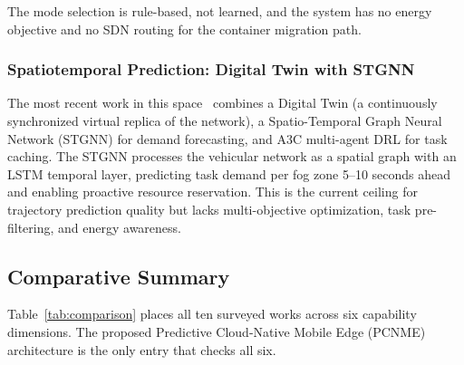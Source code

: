 \documentclass[12pt,a4paper]{article}
\begin{document}
The mode selection is rule-based, not learned, and the system has no energy
objective and no SDN routing for the container migration path.

\subsubsection{Spatiotemporal Prediction: Digital Twin with STGNN}

The most recent work in this space~\cite{zhu2025spatiotemporal} combines a Digital
Twin (a continuously synchronized virtual replica of the network), a
Spatio-Temporal Graph Neural Network (STGNN) for demand forecasting, and A3C
multi-agent DRL for task caching. The STGNN processes the vehicular network as a
spatial graph with an LSTM temporal layer, predicting task demand per fog zone
5--10 seconds ahead and enabling proactive resource reservation. This is the
current ceiling for trajectory prediction quality but lacks multi-objective
optimization, task pre-filtering, and energy awareness.

\subsection{Comparative Summary}

Table~\ref{tab:comparison} places all ten surveyed works across six capability
dimensions. The proposed Predictive Cloud-Native Mobile Edge (PCNME) architecture
is the only entry that checks all six.
\end{document}
